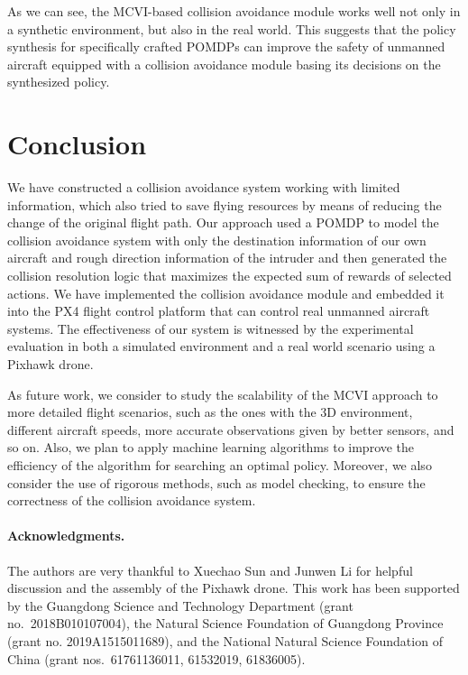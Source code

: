 \documentclass[orivec]{llncs}
\begin{document}
As we can see, the MCVI-based collision avoidance module works well not only in a synthetic environment, but also in the real world.
This suggests that the policy synthesis for specifically crafted POMDPs can improve the safety of unmanned aircraft equipped with a collision avoidance module basing its decisions on the synthesized policy.



\section{Conclusion}
\label{sec:conclusion}

We have constructed a collision avoidance system working with limited information, which also tried to save flying resources by means of reducing the change of the original flight path.
Our approach used a POMDP to model the collision avoidance system with only the destination information of our own aircraft and rough direction information of the intruder and then generated the collision resolution logic that maximizes the expected sum of rewards of selected actions.
We have implemented the collision avoidance module and embedded it into the PX4 flight control platform that can control real unmanned aircraft systems.
The effectiveness of our system is witnessed by the experimental evaluation in both a simulated environment and a real world scenario using a Pixhawk drone.

As future work, we consider to study the scalability of the MCVI approach to more detailed flight scenarios, such as the ones with the 3D environment, different aircraft speeds, more accurate observations given by better sensors, and so on.
Also, we plan to apply machine learning algorithms to improve the efficiency of the algorithm for searching an optimal policy.
Moreover, we also consider the use of rigorous methods, such as model checking, to ensure the correctness of the collision avoidance system.


\paragraph*{Acknowledgments.}
The authors are very thankful to Xuechao Sun and Junwen Li for helpful discussion and the assembly of the Pixhawk drone. 
This work has been supported by 
the Guangdong Science and Technology Department (grant no.\ 2018B010107004),
the Natural Science Foundation of Guangdong Province (grant no. 2019A1515011689), and 
the National Natural Science Foundation of China (grant nos.\ 61761136011, 61532019, 61836005).
\end{document}
